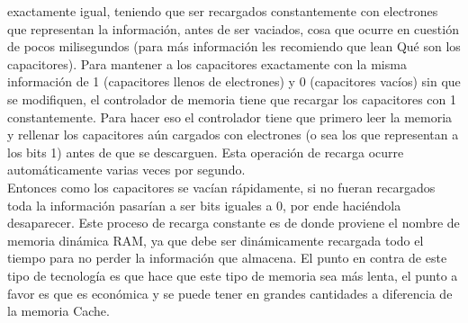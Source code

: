 \documentclass{article}
\begin{document}
exactamente igual, teniendo que ser recargados constantemente con electrones que
representan la información, antes de ser vaciados, cosa que ocurre en cuestión de pocos
milisegundos (para más información les recomiendo que lean Qué son los capacitores). Para
mantener a los capacitores exactamente con la misma información de 1 (capacitores llenos de
electrones) y 0 (capacitores vacíos) sin que se modifiquen, el controlador de memoria tiene que
recargar los capacitores con 1 constantemente. Para hacer eso el controlador tiene que primero
leer la memoria y rellenar los capacitores aún cargados con electrones (o sea los que
representan a los bits 1) antes de que se descarguen. Esta operación de recarga ocurre
automáticamente varias veces por segundo.\\[0.1cm]
Entonces como los capacitores se vacían rápidamente, si no fueran recargados toda la
información pasarían a ser bits iguales a 0, por ende haciéndola desaparecer. Este proceso de
recarga constante es de donde proviene el nombre de memoria dinámica RAM, ya que debe ser
dinámicamente recargada todo el tiempo para no perder la información que almacena. El punto
en contra de este tipo de tecnología es que hace que este tipo de memoria sea más lenta, el
punto a favor es que es económica y se puede tener en grandes cantidades a diferencia de la
memoria Cache.
\end{document}

